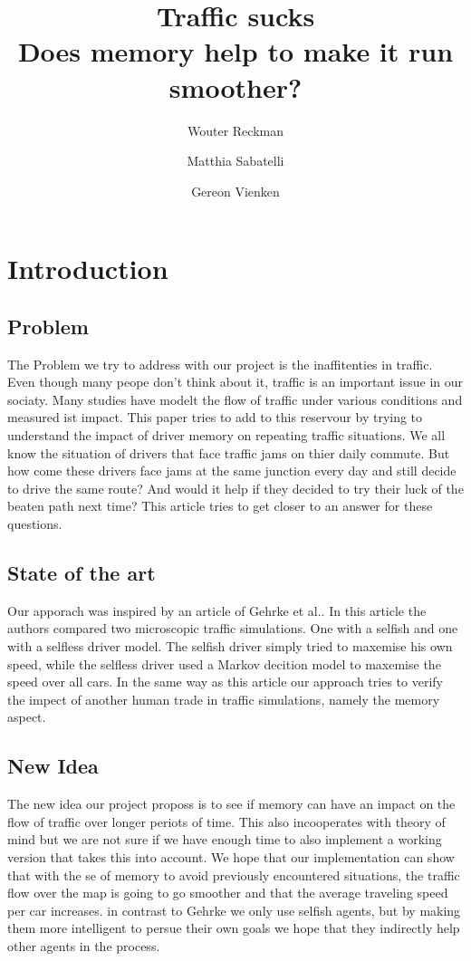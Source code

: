 \documentclass{article}
\title{\textbf{\huge Traffic sucks\\ Does memory help to make it run smoother?}}
\author{Wouter Reckman \affila \and
    Matthia Sabatelli \affilb \and
    Gereon Vienken \affila}
\begin{document}
\ttl
\thispagestyle{empty}


\begin{abstract}

\end{abstract}


\section{Introduction}

\subsection{Problem}
The Problem we try to address with our project is the inaffitenties in traffic. Even though many peope don't think about it, traffic is an important issue in our sociaty. Many studies have modelt the flow of traffic under various conditions and measured ist impact. This paper tries to add to this reservour by trying to understand the impact of driver memory on repeating traffic situations. We all know the situation of drivers that face traffic jams on thier daily commute. But how come these drivers face jams at the same junction every day and still decide to drive the same route? And would it help if they decided to try their luck of the beaten path next time? This article tries to get closer to an answer for these questions. 

\subsection{State of the art}
Our apporach was inspired by an article of Gehrke et al.\cite{gehrke2008traffic}. In this article the authors compared two microscopic traffic simulations. One with a selfish and one with a selfless driver model. The selfish driver simply tried to maxemise his own speed, while the selfless driver used a Markov decition model to maxemise the speed over all cars. In the same way as this article our approach tries to verify the impect of another human trade in traffic simulations, namely the memory aspect.  

\subsection{New Idea}
The new idea our project proposs is to see if memory can have an impact on the flow of traffic over longer periots of time. This also incooperates with theory of mind but we are not sure if we have enough time to also implement a working version that takes this into account. We hope that our implementation can show that with the se of memory to avoid previously encountered situations, the traffic flow over the map is going to go smoother and that the average traveling speed per car increases. in contrast to Gehrke we only use selfish agents, but by making them more intelligent to persue their own goals we hope that they indirectly help other agents in the process.
\end{document}
